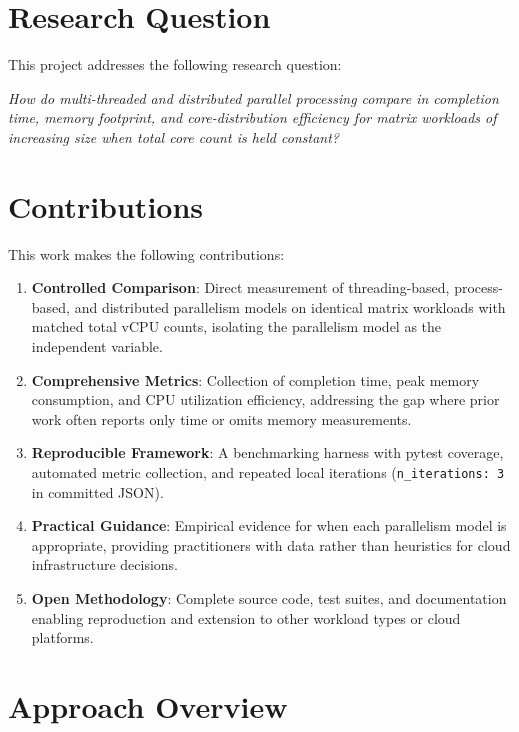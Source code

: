 \section{Research Question}

This project addresses the following research question:

\textit{How do multi-threaded and distributed parallel processing compare in completion time, memory footprint, and core-distribution efficiency for matrix workloads of increasing size when total core count is held constant?}

\section{Contributions}

This work makes the following contributions:

\begin{enumerate}
    \item \textbf{Controlled Comparison}: Direct measurement of threading-based, process-based, and distributed parallelism models on identical matrix workloads with matched total vCPU counts, isolating the parallelism model as the independent variable.
    
    \item \textbf{Comprehensive Metrics}: Collection of completion time, peak memory consumption, and CPU utilization efficiency, addressing the gap where prior work often reports only time or omits memory measurements.
    
    \item \textbf{Reproducible Framework}: A benchmarking harness with pytest coverage, automated metric collection, and repeated local iterations (\texttt{n\_iterations: 3} in committed JSON).
    
    \item \textbf{Practical Guidance}: Empirical evidence for when each parallelism model is appropriate, providing practitioners with data rather than heuristics for cloud infrastructure decisions.
    
    \item \textbf{Open Methodology}: Complete source code, test suites, and documentation enabling reproduction and extension to other workload types or cloud platforms.
\end{enumerate}

\section{Approach Overview}

